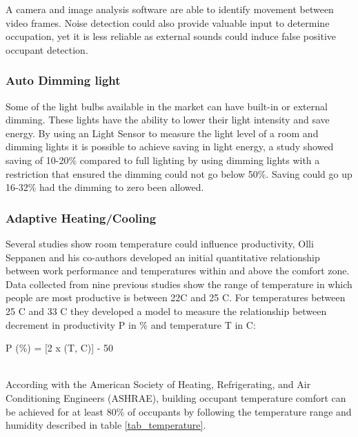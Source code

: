 A camera and image analysis software are able to identify movement between video frames. Noise detection could also provide valuable input to determine occupation, yet it is less reliable as external sounds could induce false positive occupant detection.

\subsubsection{Auto Dimming light}

Some of the light bulbs available in the market can have built-in or external dimming. These lights have the ability to lower their light intensity and save energy.
By using an Light Sensor to measure the light level of a room and dimming lights it is possible to achieve saving in light energy, a study \cite{sensor_app_lights} showed saving of 10-20\% compared to full lighting by using dimming lights with a restriction that ensured the dimming could not go below 50\%. Saving could go up 16-32\% had the dimming to zero been allowed.


\subsubsection{Adaptive Heating/Cooling}\label{related:adaptive_heating}


Several studies show room temperature could influence productivity, Olli Seppanen and his co-authors\cite{temperature_survey} developed an initial quantitative relationship between work performance and temperatures within and above the comfort zone. Data collected from nine previous studies show the range of temperature in which people are most productive is between 22C and 25 C. For temperatures between 25 C and 33 C they developed a model to measure the relationship between decrement in productivity P in \% and
temperature T in  C: 

P (\%) = [2 x (T, C)] - 50 


\mbox{}\\
According with the American Society of Heating, Refrigerating, and Air Conditioning Engineers (ASHRAE), building occupant temperature comfort can be achieved for at least 80\% of occupants\cite{std_ASHRAE_55} by following the temperature range and humidity described in table \ref{tab_temperature}.

